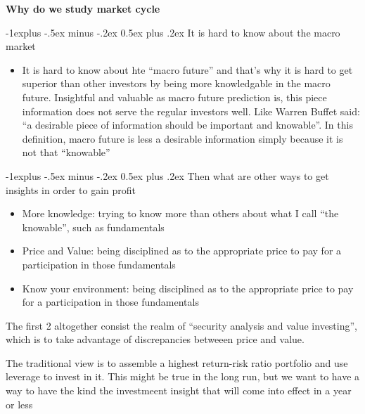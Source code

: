 \documentclass[10pt,portrait]{article}
\makeatletter
\renewcommand{\subsection}{\@startsection{subsection}{2}{0mm}%
                                {-1explus -.5ex minus -.2ex}%
                                {0.5ex plus .2ex}%
                                {\normalfont\normalsize\bfseries}}
\makeatother
\begin{document}
\newpage
    \begin{center}
         \Large{\textbf{Why do we study market cycle}} \\
    \end{center}

    \subsection{\color{blue}It is hard to know about the macro market}
    \begin{itemize}
        \item It is hard to know about hte ``macro future'' and that's why it is hard to get superior than other investors by being more knowledgable in the macro future. Insightful and valuable as macro future prediction is, this piece information does not serve the regular investors well. Like Warren Buffet said: ``a desirable piece of information should be important and knowable''. In this definition, macro future is less a desirable information simply because it is not that ``knowable''
    \end{itemize}

    \subsection{\color{blue}Then what are other ways to get insights in order to gain profit}
    \begin{itemize}
        \item More knowledge: trying to know more than others about what I call ``the knowable'', such as fundamentals
        \item Price and Value: being disciplined as to the appropriate price to pay for a participation in those fundamentals
        \item Know your environment: being disciplined as to the appropriate price to pay for a participation in those fundamentals
    \end{itemize}
    
        The first 2 altogether consist the realm of ``security analysis and value investing'', which is to take advantage of discrepancies betweeen price and value.

        The traditional view is to assemble a highest return-risk ratio portfolio and use leverage to invest in it. This might be true in the long run, but we want to have a way to have the kind the investmeent insight that will come into effect in a year or less
\end{document}
